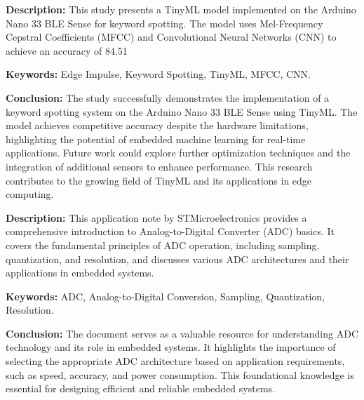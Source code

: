 %
%
%
%


{
	\textbf{Description:} This study presents a TinyML model implemented on the Arduino Nano 33 BLE Sense for keyword spotting. The model uses Mel-Frequency Cepstral Coefficients (MFCC) and Convolutional Neural Networks (CNN) to achieve an accuracy of 84.51%
	\newline
	
	\textbf{Keywords:} Edge Impulse, Keyword Spotting, TinyML, MFCC, CNN.
	
	\newpage
	\textbf{Conclusion:} The study successfully demonstrates the implementation of a keyword spotting system on the Arduino Nano 33 BLE Sense using TinyML. The model achieves competitive accuracy despite the hardware limitations, highlighting the potential of embedded machine learning for real-time applications. Future work could explore further optimization techniques and the integration of additional sensors to enhance performance. This research contributes to the growing field of TinyML and its applications in edge computing\cite{Abbas:2023}.
}

{
	\textbf{Description:} This application note by STMicroelectronics provides a comprehensive introduction to Analog-to-Digital Converter (ADC) basics. It covers the fundamental principles of ADC operation, including sampling, quantization, and resolution, and discusses various ADC architectures and their applications in embedded systems.
	\newline
	
	\textbf{Keywords:} ADC, Analog-to-Digital Conversion, Sampling, Quantization, Resolution.
	
	\newpage
	\textbf{Conclusion:} The document serves as a valuable resource for understanding ADC technology and its role in embedded systems. It highlights the importance of selecting the appropriate ADC architecture based on application requirements, such as speed, accuracy, and power consumption. This foundational knowledge is essential for designing efficient and reliable embedded systems\cite{ADCReference:2024}.
}

